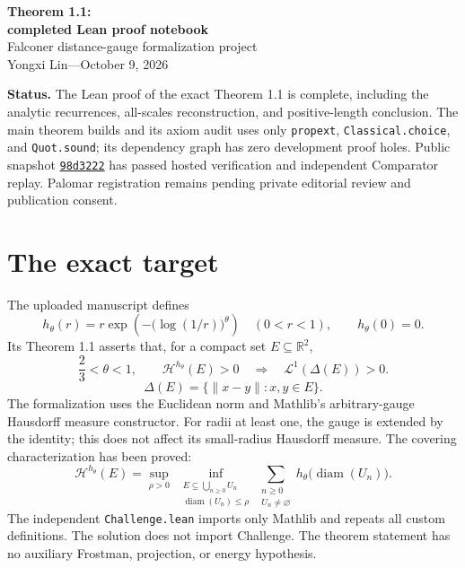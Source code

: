 \documentclass[11pt]{article}
\newcommand{\HH}{\mathcal H}
\newcommand{\LL}{\mathcal L}
\begin{document}
\begin{center}
{\Large\bfseries Theorem 1.1:\\[3pt] completed Lean proof notebook}\\[9pt]
Falconer distance-gauge formalization project\\
Yongxi Lin\quad---\quad October 9, 2026
\end{center}

\textbf{Status.} The Lean proof of the exact Theorem 1.1 is complete, including
the analytic recurrences, all-scales reconstruction, and positive-length
conclusion. The main theorem builds and its axiom audit uses only
\texttt{propext}, \texttt{Classical.choice}, and \texttt{Quot.sound}; its
dependency graph has zero development proof holes. Public snapshot
\href{https://github.com/CoolRmal/falconer-theta-gauge/tree/98d3222b42ba5fcaeb56068cf2d542c3d4851d80}{\texttt{98d3222}}
has passed hosted verification and independent Comparator replay. Palomar
registration remains pending private editorial review and publication consent.


\section*{The exact target}
The uploaded manuscript defines
\[
h_\theta(r)=r\exp\!\left(-\bigl(\log(1/r)\bigr)^\theta\right)
\quad(0<r<1),\qquad h_\theta(0)=0.
\]
Its Theorem 1.1 asserts that, for a compact set $E\subseteq\mathbb R^2$,
\[
\frac23<\theta<1,\qquad \HH^{h_\theta}(E)>0
\quad\Longrightarrow\quad \LL^1(\Delta(E))>0.
\]
\[
\Delta(E)=\{\lVert x-y\rVert:x,y\in E\}.
\]
The formalization uses the Euclidean norm and Mathlib's arbitrary-gauge
Hausdorff measure constructor. For radii at least one, the gauge is extended
by the identity; this does not affect its small-radius Hausdorff measure.
The covering characterization has been proved:
\[
\HH^{h_\theta}(E)=
\sup_{\rho>0}\ \inf_{\substack{E\subseteq\bigcup_{n\ge0}U_n\\
\operatorname{diam}(U_n)\le\rho}}
\sum_{\substack{n\ge0\\U_n\ne\varnothing}}
h_\theta\bigl(\operatorname{diam}(U_n)\bigr).
\]
The independent \texttt{Challenge.lean} imports only Mathlib and repeats all
custom definitions. The solution does not import Challenge. The theorem
statement has no auxiliary Frostman, projection, or energy hypothesis.
\end{document}
